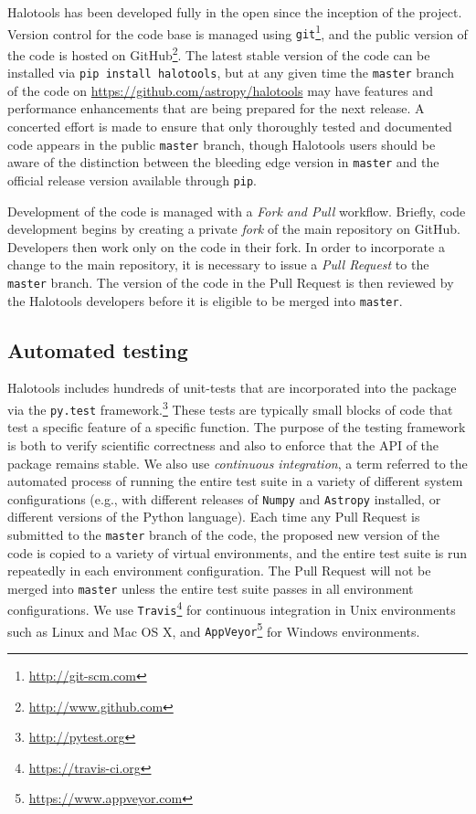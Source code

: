 \documentclass[twocolumn, tighten]{aastex6}
\begin{document}
Halotools has been developed fully in the open since the inception of the project. Version control for the code base is managed using {\tt git}\footnote{\url{http://git-scm.com}}, and the public version of the code is hosted on GitHub\footnote{\url{http://www.github.com}}. The latest stable version of the code can be installed via {\tt pip install halotools}, but at any given time the {\tt master} branch of the code on \url{https://github.com/astropy/halotools} may have features and performance enhancements that are being prepared for the next release. A concerted effort is made to ensure that only thoroughly tested and documented code appears in the public {\tt master} branch, though Halotools users should be aware of the distinction between the bleeding edge version in {\tt master} and the official release version available through {\tt pip}. 

Development of the code is managed with a {\em Fork and Pull} workflow. Briefly, code development begins by creating a private {\em fork} of the main repository on GitHub. Developers then work only on the code in their fork. In order to incorporate a change to the main repository, it is necessary to issue a {\em Pull Request} to the {\tt master} branch. The version of the code in the Pull Request is then reviewed by the Halotools developers before it is eligible to be merged into {\tt master}.

\subsection{Automated testing}
\label{subsection:testing}

Halotools includes hundreds of unit-tests that are incorporated into the package via the {\tt py.test} framework.\footnote{\url{http://pytest.org}} These tests are typically small blocks of code that test a specific feature of a specific function. The purpose of the testing framework is both to verify scientific correctness and also to enforce that the API of the package remains stable. We also use {\em continuous integration}, a term referred to the automated process of running the entire test suite in a variety of different system configurations (e.g., with different releases of {\tt Numpy} and {\tt Astropy} installed, or different versions of the Python language). Each time any Pull Request is submitted to the {\tt master} branch of the code, the proposed new version of the code is copied to a variety of virtual environments, and the entire test suite is run repeatedly in each environment configuration. The Pull Request will not be merged into {\tt master} unless the entire test suite passes in all environment configurations. We use {\tt Travis}\footnote{\url{https://travis-ci.org}} for continuous integration in Unix environments such as Linux and Mac OS X, and {\tt AppVeyor}\footnote{\url{https://www.appveyor.com}} for Windows environments. 
\end{document}

